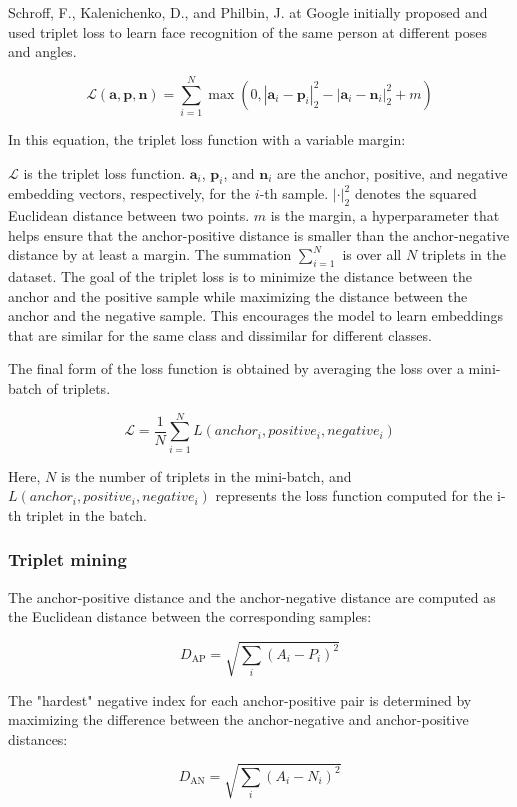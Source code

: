 Schroff, F., Kalenichenko, D., and Philbin, J. at Google initially proposed and used triplet loss to learn face recognition of the same person at different poses and angles. \cite{Schroff2015FaceNet:Clustering}

\begin{equation}
\mathcal{L}(\mathbf{a}, \mathbf{p}, \mathbf{n}) = \sum_{i=1}^{N} \max \left(0, \left| \mathbf{a}_i - \mathbf{p}_i \right|_2^2 - \left| \mathbf{a}_i - \mathbf{n}_i \right|_2^2 + m \right)
\end{equation}

In this equation, the triplet loss function with a variable margin:

$\mathcal{L}$ is the triplet loss function.
$\mathbf{a}_i$, $\mathbf{p}_i$, and $\mathbf{n}_i$ are the anchor, positive, and negative embedding vectors, respectively, for the $i$-th sample.
$\left| \cdot \right|_2^2$ denotes the squared Euclidean distance between two points.
$m$ is the margin, a hyperparameter that helps ensure that the anchor-positive distance is smaller than the anchor-negative distance by at least a margin.
The summation $\sum_{i=1}^{N}$ is over all $N$ triplets in the dataset.
The goal of the triplet loss is to minimize the distance between the anchor and the positive sample while maximizing the distance between the anchor and the negative sample. This encourages the model to learn embeddings that are similar for the same class and dissimilar for different classes.

The final form of the loss function is obtained by averaging the loss over a mini-batch of triplets. 

\begin{equation}
\mathcal{L} = \frac{1}{N} \sum_{i=1}^{N} L(anchor_i, positive_i, negative_i)
\end{equation}

Here, $N$ is the number of triplets in the mini-batch, and $L(anchor_i, positive_i, negative_i)$ represents the loss function computed for the i-th triplet in the batch.

\subsubsection{Triplet mining}

The anchor-positive distance and the anchor-negative distance are computed as the Euclidean distance between the corresponding samples:

\begin{equation}
D_{\text{AP}} = \sqrt{\sum_{i} (A_i - P_i)^2}
\end{equation}

The "hardest" negative index for each anchor-positive pair is determined by maximizing the difference between the anchor-negative and anchor-positive distances:

\begin{equation}
D_{\text{AN}} = \sqrt{\sum_{i} (A_i - N_i)^2}
\end{equation}
